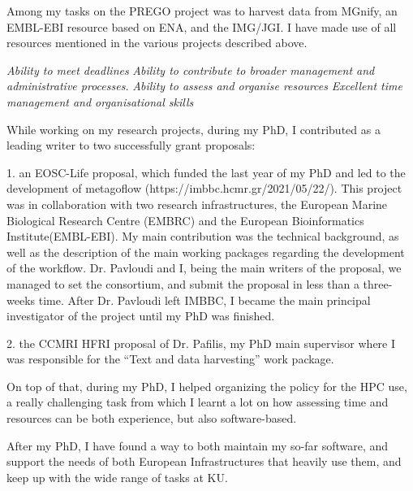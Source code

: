     Among my tasks on the PREGO project was to harvest data from MGnify, an EMBL-EBI 
    resource based on ENA, and the IMG/JGI.
    I have made use of all resources mentioned in the various projects described above.


\textit{Ability to meet deadlines}
\textit{Ability to contribute to broader management and administrative processes.}
\textit{Ability to assess and organise resources}
\textit{Excellent time management and organisational skills}

    While working on my research projects, during my PhD, I contributed as a leading writer to two 
    successfully grant proposals:

    1. an EOSC-Life proposal, which funded the last year of my PhD and led to the development of metagoflow
    (https://imbbc.hcmr.gr/2021/05/22/). 
    This project was in collaboration with two research infrastructures, the European Marine Biological Research Centre (EMBRC)
    and the European Bioinformatics Institute(EMBL-EBI).
    My main contribution was the technical background, as well as the description of the main 
    working packages regarding the development of the workflow.
    Dr. Pavloudi and I, being the main writers of the proposal, we managed to set the consortium, 
    and submit the proposal in less than a three-weeks time.
    After Dr. Pavloudi left IMBBC, I became the main principal investigator of the project until my PhD was finished. 

    2. the CCMRI HFRI proposal of Dr. Pafilis, my PhD main supervisor
    where I was responsible for the ``Text and data harvesting'' work package.

    On top of that, during my PhD, I helped organizing the policy for the HPC use, a really challenging task 
    from which I learnt a lot on how assessing time and resources can be both experience, but also software-based. 

    After my PhD, I have found a way to both maintain my so-far software, and support the needs of both 
    European Infrastructures that heavily use them, and keep up with the wide range of tasks at KU.

